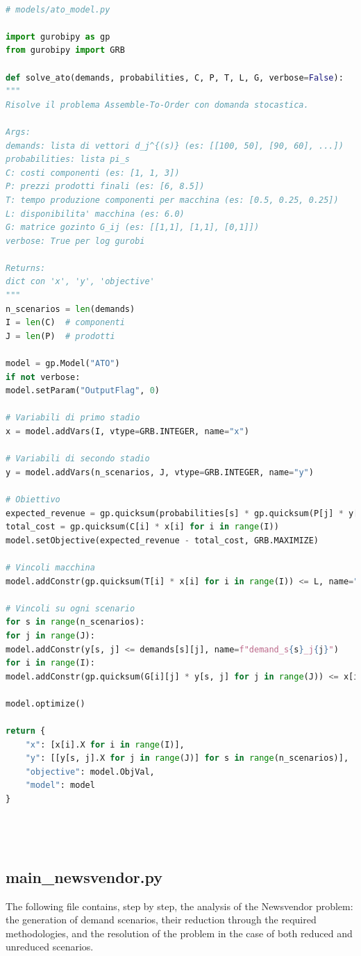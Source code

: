 \documentclass[a4paper,12pt]{article}
\begin{document}
\begin{lstlisting}[language=python,caption={Definition of the function to solve ATO model},label={lst:ATO-model}]

# models/ato_model.py

import gurobipy as gp
from gurobipy import GRB

def solve_ato(demands, probabilities, C, P, T, L, G, verbose=False):
"""
Risolve il problema Assemble-To-Order con domanda stocastica.

Args:
demands: lista di vettori d_j^{(s)} (es: [[100, 50], [90, 60], ...])
probabilities: lista pi_s
C: costi componenti (es: [1, 1, 3])
P: prezzi prodotti finali (es: [6, 8.5])
T: tempo produzione componenti per macchina (es: [0.5, 0.25, 0.25])
L: disponibilita' macchina (es: 6.0)
G: matrice gozinto G_ij (es: [[1,1], [1,1], [0,1]])
verbose: True per log gurobi

Returns:
dict con 'x', 'y', 'objective'
"""
n_scenarios = len(demands)
I = len(C)  # componenti
J = len(P)  # prodotti

model = gp.Model("ATO")
if not verbose:
model.setParam("OutputFlag", 0)

# Variabili di primo stadio
x = model.addVars(I, vtype=GRB.INTEGER, name="x")

# Variabili di secondo stadio
y = model.addVars(n_scenarios, J, vtype=GRB.INTEGER, name="y")

# Obiettivo
expected_revenue = gp.quicksum(probabilities[s] * gp.quicksum(P[j] * y[s, j] for j in range(J)) for s in range(n_scenarios))
total_cost = gp.quicksum(C[i] * x[i] for i in range(I))
model.setObjective(expected_revenue - total_cost, GRB.MAXIMIZE)

# Vincoli macchina
model.addConstr(gp.quicksum(T[i] * x[i] for i in range(I)) <= L, name="capacity")

# Vincoli su ogni scenario
for s in range(n_scenarios):
for j in range(J):
model.addConstr(y[s, j] <= demands[s][j], name=f"demand_s{s}_j{j}")
for i in range(I):
model.addConstr(gp.quicksum(G[i][j] * y[s, j] for j in range(J)) <= x[i], name=f"gozinto_s{s}_i{i}")

model.optimize()

return {
	"x": [x[i].X for i in range(I)],
	"y": [[y[s, j].X for j in range(J)] for s in range(n_scenarios)],
	"objective": model.ObjVal,
	"model": model
}

	
	
\end{lstlisting}

\subsection{main\_newsvendor.py}
The following file contains, step by step, the analysis of the Newsvendor problem: the generation of demand scenarios, their reduction through the required methodologies, and the resolution of the problem in the case of both reduced and unreduced scenarios.
\end{document}
